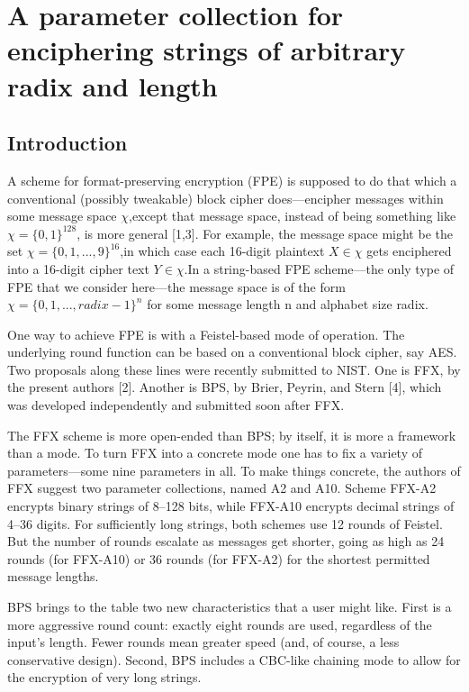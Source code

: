 
\chapter{A parameter collection for enciphering strings of arbitrary radix and length}
\section{Introduction}
A scheme for format-preserving encryption (FPE) is supposed to do that which a conventional (possibly tweakable) block cipher does—encipher messages within some message space $\chi$,except that message space, instead of being something like $\chi=\{0,1\}^{128}$, is more general [1,3]. For example, the message space might be the set $\chi= \{0,1,...,9\}^{16}$,in which case each 16-digit plaintext $X\in \chi$ gets enciphered into a 16-digit cipher text $Y\in \chi$.In a string-based FPE scheme—the only type of FPE that we consider here—the message space is of the form
$\chi = \{0,1,...,radix-1\}^n$ for some message length n and alphabet size radix.

One way to achieve FPE is with a Feistel-based mode of operation. The underlying round function can be based on a conventional block cipher, say AES. Two proposals along these lines were recently submitted to NIST. One is FFX, by the present authors [2]. Another is BPS, by Brier, Peyrin, and Stern [4], which was developed independently and submitted soon after FFX.

The FFX scheme is more open-ended than BPS; by itself, it is more a framework than a mode. To turn FFX into a concrete mode one has to fix a variety of parameters—some nine parameters in all. To make things concrete, the authors of FFX suggest two parameter collections, named A2 and A10. Scheme FFX-A2 encrypts binary strings of 8–128 bits, while FFX-A10 encrypts decimal strings of 4–36 digits. For sufficiently long strings, both schemes use 12 rounds of Feistel. But the number of rounds escalate as messages get shorter, going as high as 24 rounds (for FFX-A10) or 36 rounds (for FFX-A2) for the shortest permitted message lengths.

BPS brings to the table two new characteristics that a user might like. First is a more aggressive round count: exactly eight rounds are used, regardless of the input’s length. Fewer rounds mean greater speed (and, of course, a less conservative design). Second, BPS includes a CBC-like chaining mode to allow for the encryption of very long strings.

